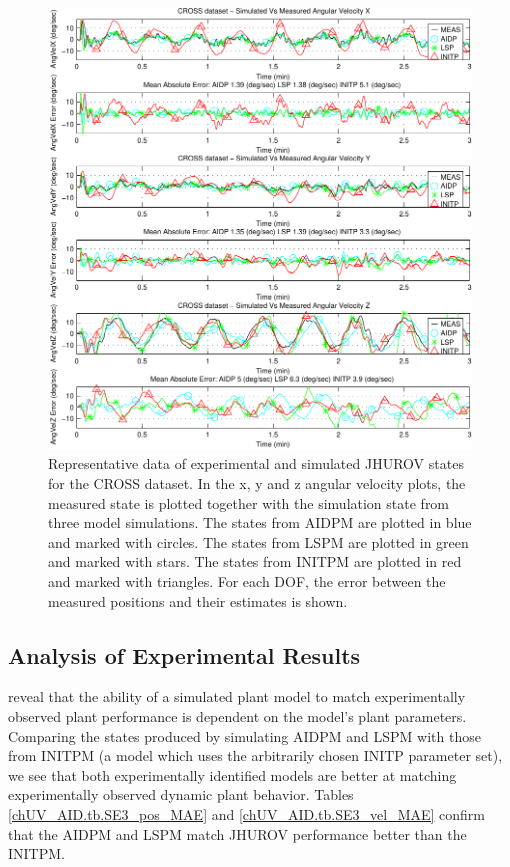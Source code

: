 \begin{center}
\begin{figure}[htbp]
  \begin{center}
    \includegraphics[width=6in]{./chUV_AID/images/SE3_crossAngVel}
  \end{center}
  \caption{ Representative data of experimental and simulated
    \ac{JHUROV} states for the \ac{CROSS} dataset. In the x, y and z
    angular velocity plots, the measured state is plotted together
    with the simulation state from three model simulations. The states
    from \ac{AIDPM} are plotted in blue and marked with circles.  The
    states from \ac{LSPM} are plotted in green and marked with stars.
    The states from \ac{INITPM} are plotted in red and marked with
    triangles.  For each \ac{DOF}, the error between the measured
    positions and their estimates is shown.}
  \label{chUV_AID.fig.SE3_crossAngVel}
\end{figure}
\end{center}


\subsection{Analysis of Experimental Results}


reveal that the ability of a simulated plant model to match
experimentally observed plant performance is dependent on the model's
plant parameters.
%
Comparing the states produced by simulating \ac{AIDPM} and \ac{LSPM}
with those from \ac{INITPM} (a model which uses the arbitrarily chosen
\ac{INITP} parameter set), we see that both experimentally identified
models are better at matching experimentally observed dynamic plant
behavior.
%
Tables \ref{chUV_AID.tb.SE3_pos_MAE} and \ref{chUV_AID.tb.SE3_vel_MAE}
confirm that the \ac{AIDPM} and \ac{LSPM} match \ac{JHUROV} performance
better than the \ac{INITPM}.

